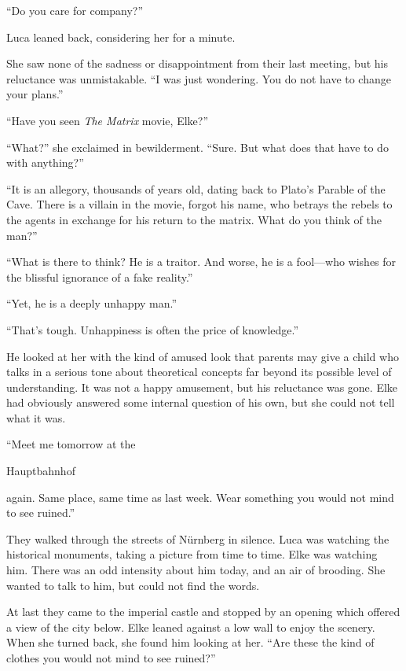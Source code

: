 ``Do you care for company?''

Luca leaned back, considering her for a minute.

She saw none of the sadness or disappointment from their last meeting, but his reluctance was unmistakable. ``I was just wondering. You do not have to change your plans.''

``Have you seen \emph{The Matrix} movie, Elke?''

``What?'' she exclaimed in bewilderment. ``Sure. But what does that have to do with anything?''

``It is an allegory, thousands of years old, dating back to Plato's Parable of the Cave. There is a villain in the movie, forgot his name, who betrays the rebels to the agents in exchange for his return to the matrix. What do you think of the man?''

``What is there to think? He is a traitor. And worse, he is a fool---who wishes for the blissful ignorance of a fake reality.''

``Yet, he is a deeply unhappy man.''

``That's tough. Unhappiness is often the price of knowledge.''

He looked at her with the kind of amused look that parents may give a child who talks in a serious tone about theoretical concepts far beyond its possible level of understanding. It was not a happy amusement, but his reluctance was gone. Elke had obviously answered some internal question of his own, but she could not tell what it was.

``Meet me tomorrow at the \begin{otherlanguage}{ngerman}Hauptbahnhof\end{otherlanguage}{} again. Same place, same time as last week. Wear something you would not mind to see ruined.''

\sectionline

They walked through the streets of Nürnberg in silence. Luca was watching the historical monuments, taking a picture from time to time. Elke was watching him. There was an odd intensity about him today, and an air of brooding. She wanted to talk to him, but could not find the words.

At last they came to the imperial castle and stopped by an opening which offered a view of the city below. Elke leaned against a low wall to enjoy the scenery. When she turned back, she found him looking at her. ``Are these the kind of clothes you would not mind to see ruined?''


